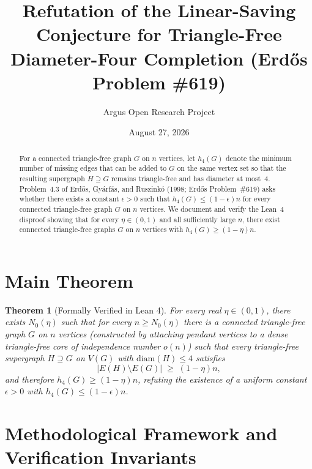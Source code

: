 \documentclass[10pt,reqno]{amsart}
\title[Triangle-Free Diameter-Four Completion Requires $(1-o(1))n$ Edges (Erd\H{o}s \#619)]
{Refutation of the Linear-Saving Conjecture for Triangle-Free Diameter-Four Completion (Erd\H{o}s Problem \#619)}
\author{Argus Open Research Project}
\date{August 27, 2026}
\newtheorem{theorem}{Theorem}[section]
\theoremstyle{definition}
\begin{document}
\begin{abstract}
For a connected triangle-free graph $G$ on $n$ vertices, let $h_4(G)$ denote the minimum number of missing edges that can be added to $G$ on the same vertex set so that the resulting supergraph $H\supseteq G$ remains triangle-free and has diameter at most~$4$. Problem~4.3 of Erd\H{o}s, Gy\'arf\'as, and Ruszink\'o (1998; Erd\H{o}s Problem~\#619) asks whether there exists a constant $\epsilon>0$ such that $h_4(G)\le(1-\epsilon)n$ for every connected triangle-free graph $G$ on $n$ vertices. We document and verify the Lean~4 disproof showing that for every $\eta\in(0,1)$ and all sufficiently large $n$, there exist connected triangle-free graphs $G$ on $n$ vertices with $h_4(G)\ge(1-\eta)n$.
\end{abstract}
\maketitle
\section{Main Theorem}
\begin{theorem}[Formally Verified in Lean 4]
For every real $\eta\in(0,1)$, there exists $N_0(\eta)$ such that for every $n\ge N_0(\eta)$ there is a connected triangle-free graph $G$ on $n$ vertices (constructed by attaching pendant vertices to a dense triangle-free core of independence number $o(n)$) such that every triangle-free supergraph $H\supseteq G$ on $V(G)$ with $\mathrm{diam}(H)\le 4$ satisfies
\[
  |E(H)\setminus E(G)| \;\ge\; (1-\eta)n,
\]
and therefore $h_4(G)\ge (1-\eta)n$, refuting the existence of a uniform constant $\epsilon>0$ with $h_4(G)\le(1-\epsilon)n$.
\end{theorem}

\section{Methodological Framework and Verification Invariants}
\end{document}
